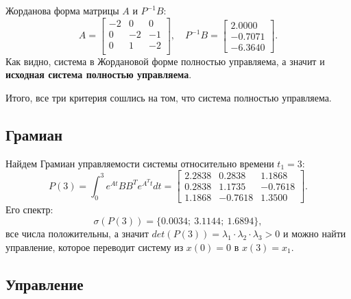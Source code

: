 Жорданова форма матрицы $A$ и $P^{-1}B$:
\begin{equation*}
    A =\begin{bmatrix}
        
-2&	   0&	   0\\
0&	  -2&	   -1\\
0&	   1&	  -2\\

    \end{bmatrix},\quad
    P^{-1}B=\begin{bmatrix}
        2.0000 \\ -0.7071 \\ -6.3640
    \end{bmatrix}.
\end{equation*}
Как видно, система в Жордановой форме полностью управляема, а значит и \textbf{исходная система
полностью управляема}.

Итого, все три критерия сошлись на том, что система полностью управляема.

\subsection{Грамиан}

Найдем Грамиан управляемости системы относительно времени $t_1=3$:
\begin{equation*}
    P(3)=\int_{0}^{3}e^{At}BB^Te^{A^Tt}dt=
    \begin{bmatrix}
        2.2838  &  0.2838  &  1.1868 \\
        0.2838   & 1.1735  & -0.7618 \\
        1.1868  & -0.7618  &  1.3500
    \end{bmatrix}.
\end{equation*}
Его спектр:
\begin{equation*}
    \sigma(P(3))=\{ 0.0034;\ 
    3.1144;\ 
    1.6894\},
\end{equation*}
все числа положительны, а значит $det(P(3))=\lambda_1\cdot\lambda_2\cdot\lambda_3>0$ и
можно найти управление, которое переводит систему из $x(0)=0$ в $x(3) = x_1$.

\subsection{Управление}

